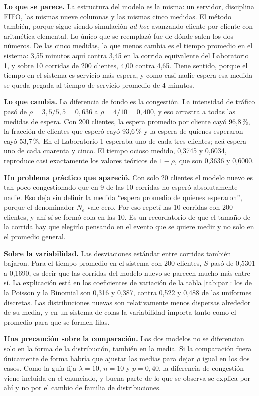 \documentclass[11pt,letterpaper]{article}
\begin{document}
\textbf{Lo que se parece.} La estructura del modelo es la misma: un servidor, disciplina FIFO, las
mismas nueve columnas y las mismas cinco medidas. El método también, porque sigue siendo simulación
\emph{ad hoc} avanzando cliente por cliente con aritmética elemental. Lo único que se reemplazó fue de
dónde salen los dos números. De las cinco medidas, la que menos cambia es el tiempo promedio en el
sistema: 3,55 minutos aquí contra 3,45 en la corrida equivalente del Laboratorio 1, y sobre 10
corridas de 200 clientes, 4,00 contra 4,65. Tiene sentido, porque el tiempo en el sistema es servicio
más espera, y como casi nadie espera esa medida se queda pegada al tiempo de servicio promedio de 4
minutos.

\textbf{Lo que cambia.} La diferencia de fondo es la congestión. La intensidad de tráfico pasó de
$\rho = 3{,}5/5{,}5 = 0{,}636$ a $\rho = 4/10 = 0{,}400$, y eso arrastra a todas las medidas de
espera. Con 200 clientes, la espera promedio por cliente cayó 96,8\,\%, la fracción de clientes que
esperó cayó 93,6\,\% y la espera de quienes esperaron cayó 53,7\,\%. En el Laboratorio 1 esperaba uno
de cada tres clientes; acá espera uno de cada cuarenta y cinco. El tiempo ocioso medido, 0,3745 y
0,6034, reproduce casi exactamente los valores teóricos de $1-\rho$, que son 0,3636 y 0,6000.

\textbf{Un problema práctico que apareció.} Con solo 20 clientes el modelo nuevo es tan poco
congestionado que en 9 de las 10 corridas no esperó absolutamente nadie. Eso deja sin definir la
medida ``espera promedio de quienes esperaron'', porque el denominador $N_e$ vale cero. Por eso
repetí las 10 corridas con 200 clientes, y ahí sí se formó cola en las 10. Es un recordatorio de que
el tamaño de la corrida hay que elegirlo pensando en el evento que se quiere medir y no solo en el
promedio general.

\textbf{Sobre la variabilidad.} Las desviaciones estándar entre corridas también bajaron. Para el
tiempo promedio en el sistema con 200 clientes, $S$ pasó de 0,5301 a 0,1690, es decir que las
corridas del modelo nuevo se parecen mucho más entre sí. La explicación está en los coeficientes de
variación de la tabla \ref{tab:par}: los de la Poisson y la Binomial son 0,316 y 0,387, contra 0,522
y 0,488 de las uniformes discretas. Las distribuciones nuevas son relativamente menos dispersas
alrededor de su media, y en un sistema de colas la variabilidad importa tanto como el promedio para
que se formen filas.

\textbf{Una precaución sobre la comparación.} Los dos modelos no se diferencian solo en la forma de
la distribución, también en la media. Si la comparación fuera únicamente de forma habría que ajustar
las medias para dejar $\rho$ igual en los dos casos. Como la guía fija $\lambda = 10$, $n = 10$ y
$p = 0{,}40$, la diferencia de congestión viene incluida en el enunciado, y buena parte de lo que se
observa se explica por ahí y no por el cambio de familia de distribuciones.
\end{document}
